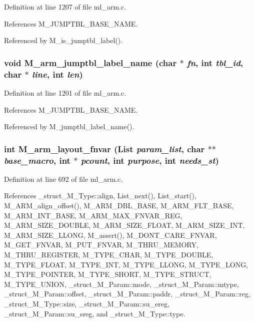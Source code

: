 Definition at line 1207 of file ml\_\-arm.c.

References M\_\-JUMPTBL\_\-BASE\_\-NAME.

Referenced by M\_\-is\_\-jumptbl\_\-label().
\subsubsection{\setlength{\rightskip}{0pt plus 5cm}void M\_\-arm\_\-jumptbl\_\-label\_\-name (char $\ast$ {\em fn}, int {\em tbl\_\-id}, char $\ast$ {\em line}, int {\em len})}\label{m__arm_8h_206b1021c25cf86a8cbf9b601b07b270}




Definition at line 1201 of file ml\_\-arm.c.

References M\_\-JUMPTBL\_\-BASE\_\-NAME.

Referenced by M\_\-jumptbl\_\-label\_\-name().
\subsubsection{\setlength{\rightskip}{0pt plus 5cm}int M\_\-arm\_\-layout\_\-fnvar (\bf{List} {\em param\_\-list}, char $\ast$$\ast$ {\em base\_\-macro}, int $\ast$ {\em pcount}, int {\em purpose}, int {\em needs\_\-st})}\label{m__arm_8h_3bae55a86ac37cf02fb79eb56919719e}




Definition at line 692 of file ml\_\-arm.c.

References \_\-struct\_\-M\_\-Type::align, List\_\-next(), List\_\-start(), M\_\-ARM\_\-align\_\-offset(), M\_\-ARM\_\-DBL\_\-BASE, M\_\-ARM\_\-FLT\_\-BASE, M\_\-ARM\_\-INT\_\-BASE, M\_\-ARM\_\-MAX\_\-FNVAR\_\-REG, M\_\-ARM\_\-SIZE\_\-DOUBLE, M\_\-ARM\_\-SIZE\_\-FLOAT, M\_\-ARM\_\-SIZE\_\-INT, M\_\-ARM\_\-SIZE\_\-LLONG, M\_\-assert(), M\_\-DONT\_\-CARE\_\-FNVAR, M\_\-GET\_\-FNVAR, M\_\-PUT\_\-FNVAR, M\_\-THRU\_\-MEMORY, M\_\-THRU\_\-REGISTER, M\_\-TYPE\_\-CHAR, M\_\-TYPE\_\-DOUBLE, M\_\-TYPE\_\-FLOAT, M\_\-TYPE\_\-INT, M\_\-TYPE\_\-LLONG, M\_\-TYPE\_\-LONG, M\_\-TYPE\_\-POINTER, M\_\-TYPE\_\-SHORT, M\_\-TYPE\_\-STRUCT, M\_\-TYPE\_\-UNION, \_\-struct\_\-M\_\-Param::mode, \_\-struct\_\-M\_\-Param::mtype, \_\-struct\_\-M\_\-Param::offset, \_\-struct\_\-M\_\-Param::paddr, \_\-struct\_\-M\_\-Param::reg, \_\-struct\_\-M\_\-Type::size, \_\-struct\_\-M\_\-Param::su\_\-ereg, \_\-struct\_\-M\_\-Param::su\_\-sreg, and \_\-struct\_\-M\_\-Type::type.

